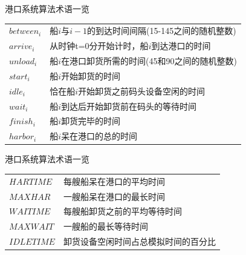 \documentclass[mathserif, table]{beamer}
\begin{document}
\begin{frame}{港口系统算法术语一览}

  \begin{table}
    \centering
    \begin{tabular}{ll}
      $between_i$ & 船$i$与$i-1$的到达时间间隔(15-145之间的随机整数)\\
      $arrive_i$  & 从时钟t=0分开始计时，船$i$到达港口的时间\\
      $unload_i$  &  船$i$在港口卸货所需的时间(45和90之间的随机整数)\\
      $start_i$    &  船$i$开始卸货的时间\\
      $idle_i$     &  恰在船$i$开始卸货之前码头设备空闲的时间\\
      $wait_i$     &  船$i$到达后开始卸货前在码头的等待时间\\
      $finish_i$   &   船$i$卸货完毕的时间\\
      $harbor_i$   &  船$i$呆在港口的总的时间\\
    \end{tabular}
  \end{table}
\end{frame}

\begin{frame}{港口系统算法术语一览}

  \begin{table}
    \centering
    \begin{tabular}{ll}
      $HARTIME$ & 每艘船呆在港口的平均时间\\
      $MAXHAR$ & 一艘船呆在港口的最长时间\\
      $WAITIME$ &  每艘船卸货之前的平均等待时间\\
      $MAXWAIT$ & 一艘船的最长等待时间\\
      $IDLETIME$ &  卸货设备空闲时间占总模拟时间的百分比
    \end{tabular}
  \end{table}
\end{frame}
    
\end{document}
